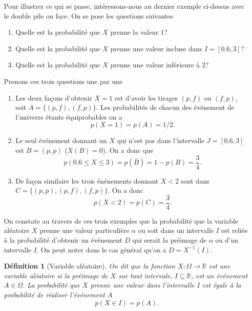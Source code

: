 \documentclass[a4paper,12pt]{book}
\newcommand{\real}{\mathbb{R}}
\newtheorem{definition}{Définition}
\begin{document}
Pour illustrer ce qui se passe, intéressons-nous au dernier exemple ci-dessus avec le double pile ou face. On se pose les questions suivantes
\begin{enumerate}
 \item Quelle est la probabilité que $X$ prenne la valeur $1$?
 \item Quelle est la probabilité que $X$ prenne une valeur incluse dans $I=[0.6,3]$?
 \item Quelle est la probabilité que $X$ prenne une valeur inférieure à $2$?
\end{enumerate}

Prenons ces trois questions une par une
\begin{enumerate}
 \item Les deux façons d'obtenir $X=1$ est d'avoir les tirages $(p,f)$ ou $(f,p)$, soit $A=\{(p,f), (f,p)\}$. Les probabilités de chacun 
 des événement de l'univerrs étants équiprobables on a 
 \begin{equation}
  p(X=1)=p(A)=1/2.
 \end{equation}
 \item Le seul événement donnant un $X$ qui n'est pas dans l'intervalle $J=[0.6,3]$ est $B=(p,p)$ ($X(B)=0$). On a donc que 
 \begin{equation}
p(0.6\leq X\leq 3)=p(\bar B)=1-p(B)=\frac{3}{4}.
 \end{equation}
 \item De façon similaire les trois énénements donnant $X<2$ sont dans $C=\{(p,p), (p,f), (f,p)\}$. On a donc
 \begin{equation}
  p(X<2)=p(C)=\frac{3}{4}.
 \end{equation}

\end{enumerate}
On constate au travers de ces trois exemples que la probabilité que la variable 
aléatoire $X$ prenne une valeur particulière $\alpha$ ou soit dans un intervalle $I$ 
est reliée à la probabilité d'obtenir un événement $D$ qui serait la préimage de $\alpha$ ou d'un intervalle $I$.
On peut noter dans le cas général qu'on a $D=X^{-1}(I)$.

\begin{definition}[Variable aléatoire] On dit que la fonction $X:\Omega\rightarrow\real$ est une \textit{variable aléatoire} si la 
préimage de $X$ sur tout intervale, $I\subseteq\real$, est un événement $A\in \Omega$. La probabilité que $X$ prenne une valeur 
dans l'intervalle $I$ est égale à la probabilité de réaliser l'événement $A$
\begin{equation}
 p(X\in I)=p(A).
\end{equation}
\end{definition}
\end{document}
